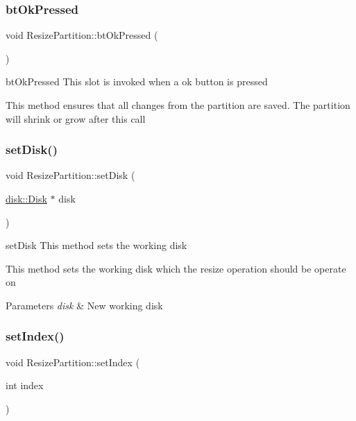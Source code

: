 \subsubsection{\texorpdfstring{bt\+Ok\+Pressed}{btOkPressed}}
{\footnotesize\ttfamily void Resize\+Partition\+::bt\+Ok\+Pressed (\begin{DoxyParamCaption}{ }\end{DoxyParamCaption})\hspace{0.3cm}{\ttfamily [slot]}}



bt\+Ok\+Pressed This slot is invoked when a ok button is pressed 

This method ensures that all changes from the partition are saved. The partition will shrink or grow after this call \mbox{\label{class_resize_partition_a477681a06df5266ddc7467c4083c8beb}} 
\subsubsection{\texorpdfstring{set\+Disk()}{setDisk()}}
{\footnotesize\ttfamily void Resize\+Partition\+::set\+Disk (\begin{DoxyParamCaption}\item[{\mbox{\hyperlink{classdisk_1_1_disk}{disk\+::\+Disk}} $\ast$}]{disk }\end{DoxyParamCaption})}



set\+Disk This method sets the working disk 

This method sets the working disk which the resize operation should be operate on 
\begin{DoxyParams}{Parameters}
{\em disk} & New working disk \\
\hline
\end{DoxyParams}
\mbox{\label{class_resize_partition_a0c564d96b48c8c9b134e73184a9f591e}} 
\subsubsection{\texorpdfstring{set\+Index()}{setIndex()}}
{\footnotesize\ttfamily void Resize\+Partition\+::set\+Index (\begin{DoxyParamCaption}\item[{int}]{index }\end{DoxyParamCaption})}



